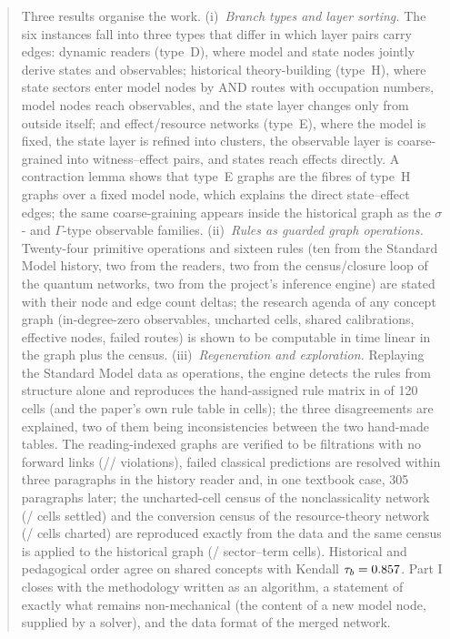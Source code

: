 \documentclass[11pt,a4paper,twoside,openany]{report}
\theoremstyle{plain}
\theoremstyle{definition}
\theoremstyle{remark}
\begin{document}
\begin{abstract}
Three results organise the work. (i)~\emph{Branch types and layer sorting.} The six instances fall into three types that differ in which layer pairs carry edges: dynamic readers (type~D), where model and state nodes jointly derive states and observables; historical theory-building (type~H), where state sectors enter model nodes by AND routes with occupation numbers, model nodes reach observables, and the state layer changes only from outside itself; and effect/resource networks (type~E), where the model is fixed, the state layer is refined into clusters, the observable layer is coarse-grained into witness--effect pairs, and states reach effects directly. A contraction lemma shows that type~E graphs are the fibres of type~H graphs over a fixed model node, which explains the direct state--effect edges; the same coarse-graining appears inside the historical graph as the $\sigma$- and $\Gamma$-type observable families. (ii)~\emph{Rules as guarded graph operations.} Twenty-four primitive operations and sixteen rules (ten from the Standard Model history, two from the readers, two from the census/closure loop of the quantum networks, two from the project's inference engine) are stated with their node and edge count deltas; the research agenda of any concept graph (in-degree-zero observables, uncharted cells, shared calibrations, effective nodes, failed routes) is shown to be computable in time linear in the graph plus the census. (iii)~\emph{Regeneration and exploration.} Replaying the Standard Model data as operations, the engine detects the rules from structure alone and reproduces the hand-assigned rule matrix in \NhepAgree{} of 120 cells (and the paper's own rule table in \NhepPaperAgree{} cells); the three disagreements are explained, two of them being inconsistencies between the two hand-made tables. The reading-indexed graphs are verified to be filtrations with no forward links (\NEMForwardLinks{}/\NUPForwardLinks{}/\NLGForwardLinks{} violations), failed classical predictions are resolved within three paragraphs in the history reader and, in one textbook case, 305 paragraphs later; the uncharted-cell census of the nonclassicality network (\NgptSettled{}/\NgptCells{} cells settled) and the conversion census of the resource-theory network (\NqrtCharted{}/\NqrtCells{} cells charted) are reproduced exactly from the data and the same census is applied to the historical graph (\NhepSectorTermEntered{}/\NhepSectorTermCells{} sector--term cells). Historical and pedagogical order agree on \NorderN{} shared concepts with Kendall $\tau_b=\NorderTau$. Part I closes with the methodology written as an algorithm, a statement of exactly what remains non-mechanical (the content of a new model node, supplied by a solver), and the data format of the merged network.


\end{abstract}
\end{document}
